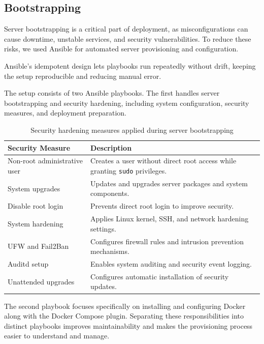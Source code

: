 \subsection{Bootstrapping}

Server bootstrapping is a critical part of deployment, as misconfigurations can cause downtime, unstable services, and security vulnerabilities. To reduce these risks, we used Ansible for automated server provisioning and configuration.

Ansible's idempotent design lets playbooks run repeatedly without drift, keeping the setup reproducible and reducing manual error.

The setup consists of two Ansible playbooks. The first handles server bootstrapping and security hardening, including system configuration, security measures, and deployment preparation.

\begin{table}[h]
\centering
\begin{tabular}{|p{4cm}|p{9cm}|}
\hline
\textbf{Security Measure} & \textbf{Description} \\
\hline
Non-root administrative user & Creates a user without direct root access while granting \texttt{sudo} privileges. \\
\hline
System upgrades & Updates and upgrades server packages and system components. \\
\hline
Disable root login & Prevents direct root login to improve security. \\
\hline
System hardening & Applies Linux kernel, SSH, and network hardening settings. \\
\hline
UFW and Fail2Ban & Configures firewall rules and intrusion prevention mechanisms. \\
\hline
Auditd setup & Enables system auditing and security event logging. \\
\hline
Unattended upgrades & Configures automatic installation of security updates. \\
\hline
\end{tabular}

\caption{Security hardening measures applied during server bootstrapping}
\label{tab:security_measures}

\end{table}

The second playbook focuses specifically on installing and configuring Docker along with the Docker Compose plugin. Separating these responsibilities into distinct playbooks improves maintainability and makes the provisioning process easier to understand and manage.